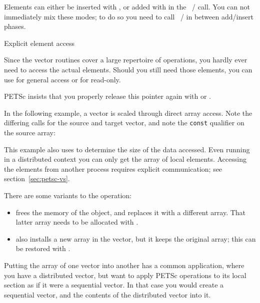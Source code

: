 Elements can either be inserted
with ,
or added with  in the
~/  call.
You can not immediately mix these modes; to do so you need to call
~/ 
in between add/insert phases.

 {Explicit element access}

Since the vector routines cover a large repertoire of operations, you
hardly ever need to access the actual elements. Should you still need
those elements, you can use  for general
access or  for read-only.

PETSc insists that you properly release this pointer again with
 or
.

In the following example, a vector is scaled through direct array access.
Note the differing calls for the source and target vector,
and note the \lstinline{const} qualifier on the source array:
%

This example also uses 
to determine the size of the data accessed.
Even running in a distributed context you can only get the array
of local elements.
Accessing the elements from another process
requires explicit communication; see section~\ref{sec:petsc-vs}.

There are some variants to the  operation:
\begin{itemize}
\item {} frees the memory of the
   object, and replaces it with a different array. That
  latter array needs to be allocated with
  .
\item {} also installs a new array in the
  vector, but it keeps the original array; this can be restored with
  .
\end{itemize}

Putting the array of one vector into another has a common application,
where you have a distributed vector, but want to apply PETSc operations
to its local section as if it were a sequential vector. In that case
you would create a sequential vector, and
 the contents of the distributed vector
into it.

